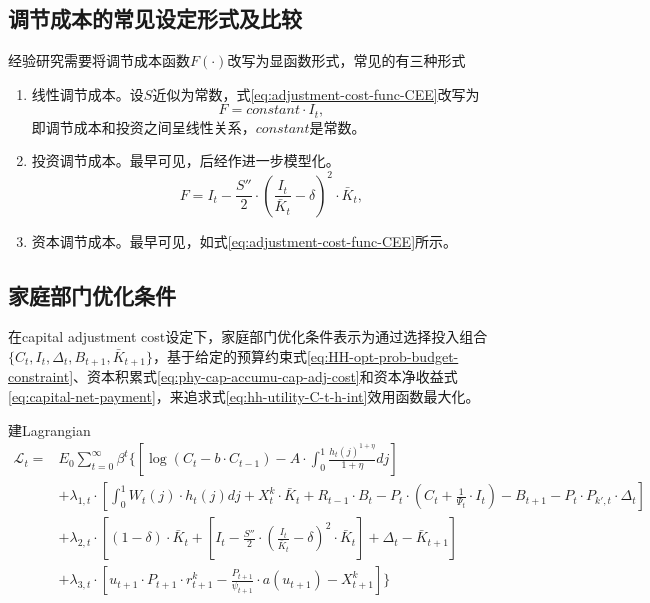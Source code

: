 \begin{subappendices}
\section{调节成本的常见设定形式及比较}
\label{sec:adjustment-cost-types-compar}
经验研究需要将调节成本函数$F(\cdot)$改写为显函数形式，常见的有三种形式
\begin{enumerate}
\item  线性调节成本。设$S$近似为常数，式\eqref{eq:adjustment-cost-func-CEE}改写为
\begin{equation}
\label{eq:adjustment-cost-lin}
F = constant \cdot I_t,
\end{equation}
即调节成本和投资之间呈线性关系，$constant$是常数。
\item 投资调节成本。最早可见\cite{Lucasjoin:1971hx}，后经\cite{Hayashi:1982bc}作进一步模型化。
\begin{equation}
\label{eq:adjustment-cost-capital}
F = I_t - \frac{S''}{2} \cdot \left(\frac{I_t}{\bar{K}_t} - \delta \right)^2 \cdot \bar{K}_{t},
\end{equation}
\item 资本调节成本。最早可见\cite{Christiano:2005ib}，如式\eqref{eq:adjustment-cost-func-CEE}所示。
\end{enumerate}



\subsection{家庭部门优化条件}
\label{sec:adj-cost-hh-optimisation}
在capital adjustment cost设定下，家庭部门优化条件表示为通过选择投入组合$\{ C_t, I_t, \Delta_t, B_{t+1}, \bar{K}_{t+1}\}$，基于给定的预算约束式\eqref{eq:HH-opt-prob-budget-constraint}、资本积累式\eqref{eq:phy-cap-accumu-cap-adj-cost}和资本净收益式\eqref{eq:capital-net-payment}，来追求式\eqref{eq:hh-utility-C-t-h-int}效用函数最大化。

建Lagrangian
\begin{align*}
\mathcal{L}_t =&E_0 \sum_{t=0}^{\infty} \beta^t \{\left[\log(C_t - b \cdot C_{t-1}) - A \cdot \int_{0}^{1} \frac{h_{t}(j)^{1+\eta}}{1+\eta} dj\right] \\
&+\lambda_{1,t} \cdot \left[
\int_{0}^{1} W_{t}(j) \cdot h_{t}(j) dj + X^k_t \cdot \bar{K}_t
 + R_{t-1} \cdot B_t - P_t \cdot \left(C_t + \frac{1}{\Psi_t} \cdot I_t \right) - B_{t+1} - P_t \cdot P_{k',t} \cdot \Delta_t
\right] \\
&+\lambda_{2,t} \cdot \left[
(1-\delta) \cdot \bar{K}_t + \left[I_t - \frac{S''}{2} \cdot \left(\frac{I_t}{\bar{K}_t} - \delta \right)^2  \cdot \bar{K}_{t}\right] + \Delta_t - \bar{K}_{t+1}
\right] \\
&+\lambda_{3,t} \cdot \left[
 u_{t+1} \cdot P_{t+1} \cdot r_{t+1}^k - \frac{P_{t+1}}{\psi_{t+1}} \cdot a(u_{t+1}) - X_{t+1}^k
\right]\}
\end{align*}


\end{subappendices}

